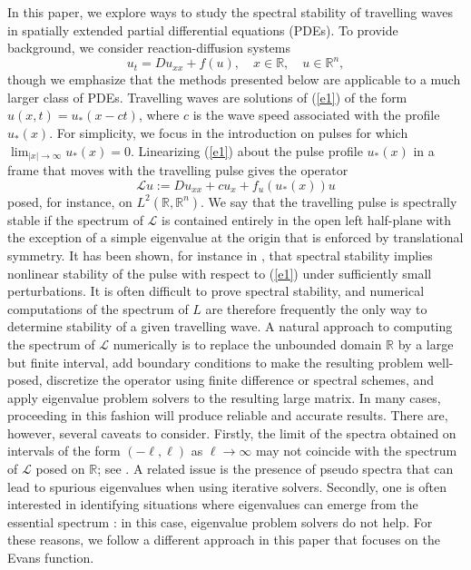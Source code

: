 \documentclass[10pt]{article}
\numberwithin{equation}{section}
\newcommand{\R}{\mathbb{R}}
\begin{document}
In this paper, we explore ways to study the spectral stability of travelling waves in spatially extended partial differential equations (PDEs). To provide background, we consider reaction-diffusion systems
\begin{equation}\label{e1}
u_t = D u_{xx} + f(u), \quad x\in\R, \quad u\in\R^n,
\end{equation}
though we emphasize that the methods presented below are applicable to a much larger class of PDEs. Travelling waves are solutions of (\ref{e1}) of the form $u(x,t)=u_*(x-ct)$, where $c$ is the wave speed associated with the profile $u_*(x)$. For simplicity, we focus in the introduction on pulses for which $\lim_{|x|\to\infty}u_*(x)=0$. Linearizing (\ref{e1}) about the pulse profile $u_*(x)$ in a frame that moves with the travelling pulse gives the operator
\[
\mathcal{L}u := D u_{xx} + c u_x + f_u(u_*(x)) u
\]
posed, for instance, on $L^2(\R,\R^n)$. We say that the travelling pulse is spectrally stable if the spectrum of $\mathcal{L}$ is contained entirely in the open left half-plane with the exception of a simple eigenvalue at the origin that is enforced by translational symmetry. It has been shown, for instance in \citep{He}, that spectral stability implies nonlinear stability of the pulse with respect to (\ref{e1}) under sufficiently small perturbations. It is often difficult to prove spectral stability, and numerical computations of the spectrum of $L$ are therefore frequently the only way to determine stability of a given travelling wave. A natural approach to computing the spectrum of $\mathcal{L}$ numerically is to replace the unbounded domain $\R$ by a large but finite interval, add boundary conditions to make the resulting problem well-posed, discretize the operator using finite difference or spectral schemes, and apply eigenvalue problem solvers to the resulting large matrix. In many cases, proceeding in this fashion will produce reliable and accurate results. There are, however, several caveats to consider. Firstly, the limit of the spectra obtained on intervals of the form $(-\ell,\ell)$ as $\ell\to\infty$ may not coincide with the spectrum of $\mathcal{L}$ posed on $\R$; see \citep{SS2000}. A related issue is the presence of pseudo spectra that can lead to spurious eigenvalues when using iterative solvers. Secondly, one is often interested in identifying situations where eigenvalues can emerge from the essential spectrum \citep{KS1998,KS2002}: in this case, eigenvalue problem solvers do not help. For these reasons, we follow a different approach in this paper that focuses on the Evans function.
\end{document}
